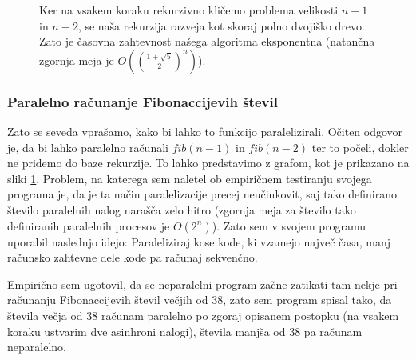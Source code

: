 \documentclass[mat1, tisk]{fmfdelo}
\begin{document}
\begin{figure}[htb]
  \centering
  \caption{Ker na vsakem koraku rekurzivno kličemo problema velikosti $n-1$ in $n-2$, se naša rekurzija razveja
  kot skoraj polno dvojiško drevo. Zato je časovna zahtevnost našega algoritma eksponentna (natančna zgornja meja je 
  $O((\frac{1 + \sqrt{5}}{2})^n)$).}
  \label{fig:fib-graph}
\end{figure}


\subsubsection{Paralelno računanje Fibonaccijevih števil}

Zato se seveda vprašamo, kako bi lahko to funkcijo paralelizirali. Očiten odgovor je, da bi lahko paralelno računali
$fib(n-1)$ in $fib(n-2)$ ter to počeli, dokler ne pridemo do baze rekurzije. To lahko predstavimo z grafom, kot je
prikazano na sliki \ref{fig:fib-graph}. Problem, na katerega sem naletel ob empiričnem testiranju svojega programa
je, da je ta način paralelizacije precej neučinkovit, saj tako definirano število paralelnih nalog narašča zelo hitro
(zgornja meja za število tako definiranih paralelnih procesov je $O(2^n)$).
Zato sem v svojem programu uporabil naslednjo idejo: Paraleliziraj kose kode, ki vzamejo največ časa, 
manj računsko zahtevne dele kode pa računaj sekvenčno.

Empirično sem ugotovil, da se neparalelni program začne zatikati tam nekje pri računanju Fibonaccijevih števil
večjih od $38$, zato sem program spisal tako, da števila večja od $38$ računam paralelno po zgoraj opisanem postopku
(na vsakem koraku ustvarim dve asinhroni nalogi), števila manjša od $38$ pa računam neparalelno.
\end{document}
